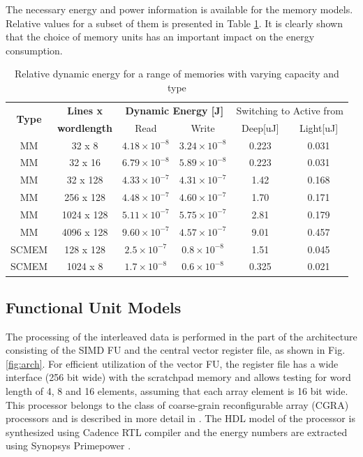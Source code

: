The necessary energy and power information is available for the memory models. Relative values for a subset of them is presented in Table \ref{tab:models}. 
It is clearly shown that the choice of memory units has an important impact on the energy consumption.

\begin{table}
\caption{Relative dynamic energy for a range of memories with varying capacity and type}
\label{tab:models}{
	\begin{tabular}{|c|c|c|c|c|c|}
		\hline
		\multirow{2}{*}{\textbf{Type}} & \textbf{Lines x} & \multicolumn{2}{c|}{\textbf{Dynamic Energy [J]}} & \multicolumn{2}{c|}{Switching to Active from} \\ \cline{3-4}
		& \textbf{wordlength} & Read & Write  & Deep[uJ] & Light[uJ]\\ 
		\hline 
		MM & 32 x 8 &  $ 4.18 \times 10^{-8} $ &  $ 3.24 \times 10^{-8} $ & 0.223 &  0.031 \\ 
		\hline
		MM & 32 x 16 & $  6.79 \times 10^{-8} $ &  $ 5.89 \times 10^{-8} $ & 0.223 &  0.031\\ 
		\hline
		MM & 32 x 128 & $  4.33 \times 10^{-7} $ &  $ 4.31 \times 10^{-7} $ & 1.42 & 0.168\\ 
		\hline
		MM & 256 x 128 & $  4.48 \times 10^{-7} $ &  $ 4.60 \times 10^{-7} $ & 1.70 &  0.171\\ 
		\hline
		MM & 1024 x 128 & $  5.11 \times 10^{-7} $ &  $ 5.75 \times 10^{-7} $ & 2.81 & 0.179\\ 
		\hline
		MM & 4096 x 128 & $  9.60 \times 10^{-7} $ &  $ 4.57 \times 10^{-7} $ & 9.01 & 0.457\\ 
		\hline
		SCMEM & 128 x 128 & $  2.5 \times 10^{-7} $ &  $ 0.8 \times 10^{-8} $ & 1.51 &  0.045\\ 
		\hline
		SCMEM & 1024 x 8 & $  1.7 \times 10^{-8} $ &  $ 0.6 \times 10^{-8} $ & 0.325 &  0.021\\ 
		\hline
	\end{tabular}}	
\end{table}

\subsection{Functional Unit Models}

The processing of the interleaved data is performed in the part of the architecture consisting of the SIMD FU and the central vector register file, as shown in Fig.\ref{fig:arch}.
For efficient utilization of the vector FU, the register file has a wide interface (256 bit wide) with the scratchpad memory and allows testing for word length of 4, 8 and 16 elements, assuming that each array element is 16 bit wide.  
This processor belongs to the class of coarse-grain reconfigurable array (CGRA)  processors and is described in more detail in \cite{lee2003compilation}.
The HDL model of the processor is synthesized using Cadence RTL compiler \cite{cadencecompiler} and the energy numbers are extracted using Synopsys Primepower \cite{kai2003synopsys}.

